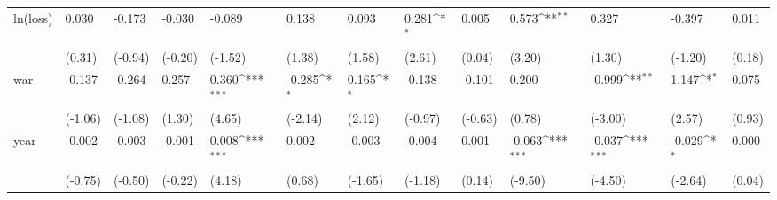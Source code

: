 \def\sym#1{\ifmmode^{#1}\else\(^{#1}\)\fi}
\begin{tabular}{p{1.5cm} p{1.7cm} p{1.7cm} p{1.7cm} p{1.7cm} p{1.7cm} p{1.7cm} p{1.7cm} p{1.7cm} p{1.7cm} p{1.7cm} p{1.7cm} p{1.7cm}}
\hline
ln(loss)        &    0.030         &   -0.173         &   -0.030         &   -0.089         &    0.138         &    0.093         &    0.281\sym{*}  &    0.005         &    0.573\sym{**} &    0.327         &   -0.397         &    0.011         \\
                &   (0.31)         &  (-0.94)         &  (-0.20)         &  (-1.52)         &   (1.38)         &   (1.58)         &   (2.61)         &   (0.04)         &   (3.20)         &   (1.30)         &  (-1.20)         &   (0.18)         \\
war             &   -0.137         &   -0.264         &    0.257         &    0.360\sym{***}&   -0.285\sym{*}  &    0.165\sym{*}  &   -0.138         &   -0.101         &    0.200         &   -0.999\sym{**} &    1.147\sym{*}  &    0.075         \\
                &  (-1.06)         &  (-1.08)         &   (1.30)         &   (4.65)         &  (-2.14)         &   (2.12)         &  (-0.97)         &  (-0.63)         &   (0.78)         &  (-3.00)         &   (2.57)         &   (0.93)         \\
year            &   -0.002         &   -0.003         &   -0.001         &    0.008\sym{***}&    0.002         &   -0.003         &   -0.004         &    0.001         &   -0.063\sym{***}&   -0.037\sym{***}&   -0.029\sym{*}  &    0.000         \\
                &  (-0.75)         &  (-0.50)         &  (-0.22)         &   (4.18)         &   (0.68)         &  (-1.65)         &  (-1.18)         &   (0.14)         &  (-9.50)         &  (-4.50)         &  (-2.64)         &   (0.04)         \\
\end{tabular}
\def\sym#1{\ifmmode^{#1}\else\(^{#1}\)\fi}
